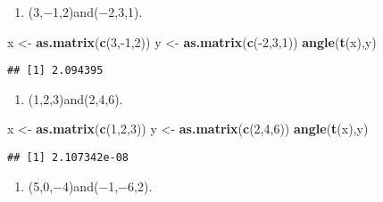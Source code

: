 \documentclass[]{article}
\newenvironment{Shaded}{\begin{snugshade}}{\end{snugshade}}
\newcommand{\KeywordTok}[1]{\textcolor[rgb]{0.13,0.29,0.53}{\textbf{{#1}}}}
\newcommand{\DecValTok}[1]{\textcolor[rgb]{0.00,0.00,0.81}{{#1}}}
\newcommand{\StringTok}[1]{\textcolor[rgb]{0.31,0.60,0.02}{{#1}}}
\newcommand{\NormalTok}[1]{{#1}}
\begin{document}
\begin{enumerate}
\def\labelenumi{(\alph{enumi})}
\itemsep1pt\parskip0pt
\item
  (3,−1,2)and(−2,3,1).
\end{enumerate}

\begin{Shaded}
\begin{Highlighting}[]
\NormalTok{x <-}\StringTok{ }\KeywordTok{as.matrix}\NormalTok{(}\KeywordTok{c}\NormalTok{(}\DecValTok{3}\NormalTok{,-}\DecValTok{1}\NormalTok{,}\DecValTok{2}\NormalTok{))}
\NormalTok{y <-}\StringTok{ }\KeywordTok{as.matrix}\NormalTok{(}\KeywordTok{c}\NormalTok{(-}\DecValTok{2}\NormalTok{,}\DecValTok{3}\NormalTok{,}\DecValTok{1}\NormalTok{))}
\KeywordTok{angle}\NormalTok{(}\KeywordTok{t}\NormalTok{(x),y)}
\end{Highlighting}
\end{Shaded}

\begin{verbatim}
## [1] 2.094395
\end{verbatim}

\begin{enumerate}
\def\labelenumi{(\alph{enumi})}
\setcounter{enumi}{1}
\itemsep1pt\parskip0pt
\item
  (1,2,3)and(2,4,6).
\end{enumerate}

\begin{Shaded}
\begin{Highlighting}[]
\NormalTok{x <-}\StringTok{ }\KeywordTok{as.matrix}\NormalTok{(}\KeywordTok{c}\NormalTok{(}\DecValTok{1}\NormalTok{,}\DecValTok{2}\NormalTok{,}\DecValTok{3}\NormalTok{))}
\NormalTok{y <-}\StringTok{ }\KeywordTok{as.matrix}\NormalTok{(}\KeywordTok{c}\NormalTok{(}\DecValTok{2}\NormalTok{,}\DecValTok{4}\NormalTok{,}\DecValTok{6}\NormalTok{))}
\KeywordTok{angle}\NormalTok{(}\KeywordTok{t}\NormalTok{(x),y)}
\end{Highlighting}
\end{Shaded}

\begin{verbatim}
## [1] 2.107342e-08
\end{verbatim}

\begin{enumerate}
\def\labelenumi{(\alph{enumi})}
\setcounter{enumi}{2}
\itemsep1pt\parskip0pt
\item
  (5,0,−4)and(−1,−6,2).
\end{enumerate}
\end{document}

